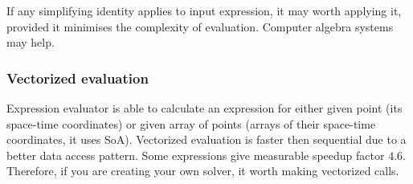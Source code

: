 If any simplifying identity applies to input expression, it may worth applying
it, provided it minimises the complexity of evaluation. Computer algebra systems
may help.

\subsubsection{Vectorized evaluation}

Expression evaluator is able to calculate an expression for either given point
(its space-time coordinates) or given array of points (arrays of their
space-time coordinates, it uses SoA). Vectorized evaluation is faster then
sequential due to a better data access pattern. Some expressions give measurable
speedup factor $4.6$. Therefore, if you are creating your own solver, it
worth making vectorized calls.